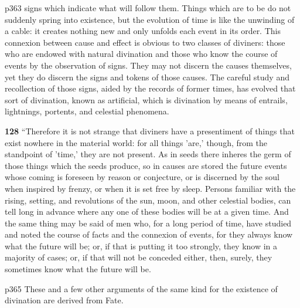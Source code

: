 p363 signs which indicate what will follow them. Things which are to be do not suddenly spring into existence, but the evolution of time is like the unwinding of a cable: it creates nothing new and only unfolds each event in its order. This connexion between cause and effect is obvious to two classes of diviners: those who are endowed with natural divination and those who know the course of events by the observation of signs. They may not discern the causes themselves, yet they do discern the signs and tokens of those causes. The careful study and recollection of those signs, aided by the records of former times, has evolved that sort of divination, known as artificial, which is divination by means of entrails, lightnings, portents, and celestial phenomena.

\textbf{128} ``Therefore it is not strange that diviners have a presentiment of things that exist nowhere in the material world: for all things 'are,' though, from the standpoint of 'time,' they are not present. As in seeds there inheres the germ of those things which the seeds produce, so in causes are stored the future events whose coming is foreseen by reason or conjecture, or is discerned by the soul when inspired by frenzy, or when it is set free by sleep. Persons familiar with the rising, setting, and revolutions of the sun, moon, and other celestial bodies, can tell long in advance where any one of these bodies will be at a given time. And the same thing may be said of men who, for a long period of time, have studied and noted the course of facts and the connexion of events, for they always know what the future will be; or, if that is putting it too strongly, they know in a majority of cases; or, if that will not be conceded either, then, surely, they sometimes know what the future will be.

p365 These and a few other arguments of the same kind for the existence of divination are derived from Fate.

